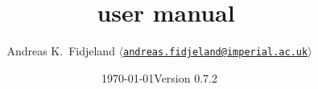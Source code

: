 \title{\nemo\ user manual}
\author{Andreas K.~Fidjeland $\langle$\href{mailto:andreas.fidjeland@imperial.ac.uk}{\nolinkurl{andreas.fidjeland@imperial.ac.uk}}$\rangle$}
\date{\today\hspace{1em}Version 0.7.2}
